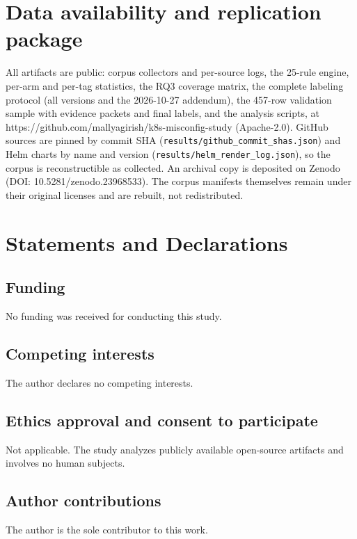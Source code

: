 \documentclass[pdflatex,sn-basic]{sn-jnl}
\begin{document}
\hypertarget{data-availability-and-replication-package}{%
\section*{Data availability and replication
package}\label{data-availability-and-replication-package}}

All artifacts are public: corpus collectors and per-source logs, the
25-rule engine, per-arm and per-tag statistics, the RQ3 coverage matrix,
the complete labeling protocol (all versions and the 2026-10-27
addendum), the 457-row validation sample with evidence packets and final
labels, and the analysis scripts, at
https://github.com/mallyagirish/k8s-misconfig-study (Apache-2.0). GitHub
sources are pinned by commit SHA
(\texttt{results/github\_commit\_shas.json}) and Helm charts by name and
version (\texttt{results/helm\_render\_log.json}), so the corpus is
reconstructible as collected. An archival copy is deposited on Zenodo (DOI:
10.5281/zenodo.23968533). The corpus manifests themselves remain under their original
licenses and are rebuilt, not redistributed.

\section*{Statements and Declarations}

\subsection*{Funding}
No funding was received for conducting this study.

\subsection*{Competing interests}
The author declares no competing interests.

\subsection*{Ethics approval and consent to participate}
Not applicable. The study analyzes publicly available open-source artifacts
and involves no human subjects.

\subsection*{Author contributions}
The author is the sole contributor to this work.
\end{document}
